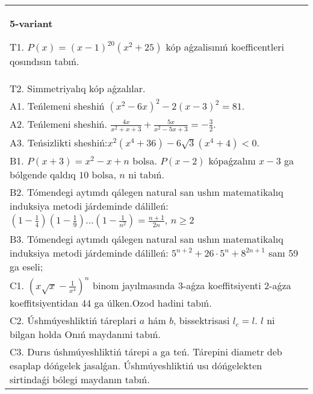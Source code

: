 \documentclass{article}
\begin{document}
\begin{tabular}{m{17cm}}
\textbf{5-variant}
\newline

T1. \(P(x) = (x - 1)^{20}\left( x^{2} + 25 \right)\) kóp aǵzalisınıń koefficentleri qosındısın tabıń. \\
T2. Simmetriyalıq kóp aǵzalılar. \\
A1. Teńlemeni sheshiń \(\left( x^{2} - 6x \right)^{2} - 2(x - 3)^{2} = 81\). \\
A2. Teńlemeni sheshiń. \(\frac{4x}{x^{2} + x + 3} + \frac{5x}{x^{2} - 5x + 3} = - \frac{3}{2}\). \\
A3. Teńsizlikti sheshiń:\(x^{2}\left( x^{4} + 36 \right) - 6\sqrt{3}\left( x^{4} + 4 \right) < 0\). \\
B1. \(P(x + 3) = x^{2} - x + n\) bolsa. \(P(x - 2)\) kópaǵzalını \(x - 3\) ga bólgende qaldıq \(10\) bolsa, \(n\) ni tabıń. \\
B2. Tómendegi aytımdı qálegen natural san ushın matematikalıq induksiya metodi járdeminde dálilleń: \(\left( 1 - \frac{1}{4} \right)\left( 1 - \frac{1}{9} \right)...\left( 1 - \frac{1}{n^{2}} \right) = \frac{n + 1}{2n}\), \(n \geq 2\) \\
B3. Tómendegi aytımdı qálegen natural san ushın matematikalıq induksiya metodi járdeminde dálilleń: \(5^{n + 2} + 26 \cdot 5^{n} + 8^{2n + 1}\) sanı 59 ga eseli; \\
C1. \(\left( x\sqrt{x} - \frac{1}{x^{4}} \right)^{n}\) binom jayılmasında 3-aǵza koeffitsiyenti 2-aǵza koeffitsiyentidan 44 ga úlken.Ozod hadini tabıń. \\
C2. Úshmúyeshliktiń táreplari \(a\) hám \(b\), bissektrisasi \(l_{c} = l\). \(l\) ni bilgan holda Onıń maydanıni tabıń. \\
C3. Durıs úshmúyeshliktiń tárepi a ga teń. Tárepini diametr deb esaplap dóńgelek jasalǵan. Úshmúyeshliktiń usı dóńgelekten sirtindaǵi bólegi maydanın tabıń. \\

\end{tabular}
\vspace{1cm}
\end{document}
